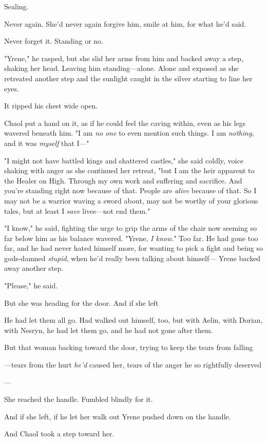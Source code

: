 Sealing.

Never again. She'd never again forgive him, smile at him, for what he'd said.

Never forget it. Standing or no.

"Yrene," he rasped, but she slid her arms from him and backed away a step, shaking her head. Leaving him standing---alone. Alone and exposed as she retreated another step and the sunlight caught in the silver starting to line her eyes.

It ripped his chest wide open.

Chaol put a hand on it, as if he could feel the caving within, even as his legs wavered beneath him. "I am \emph{no one} to even mention such things. I am \emph{nothing}, and it was \emph{myself} that I---"

"I might not have battled kings and shattered castles," she said coldly, voice shaking with anger as she continued her retreat, "but I am the heir apparent to the Healer on High. Through my own work and suffering and sacrifice. And you're standing right now because of that. People are \emph{alive} because of that. So I may not be a warrior waving a sword about, may not be worthy of your glorious tales, but at least I \emph{save} lives---not end them."

"I know," he said, fighting the urge to grip the arms of the chair now seeming so far below him as his balance wavered. "Yrene, \emph{I know}." Too far. He had gone too far, and he had never hated himself more, for wanting to pick a fight and being so gods-damned
\emph{stupid}, when he'd really been talking about himself--- Yrene backed away another step.

"Please," he said.

But she was heading for the door. And if she left 

He had let them all go. Had walked out himself, too, but with Aelin, with Dorian, with Nesryn, he had let them go, and he had not gone after them.

But that woman backing toward the door, trying to keep the tears from falling

---tears from the hurt \emph{he'd} caused her, tears of the anger he so rightfully deserved

---

She reached the handle. Fumbled blindly for it.

And if she left, if he let her walk out  Yrene pushed down on the handle.

And Chaol took a step toward her.

